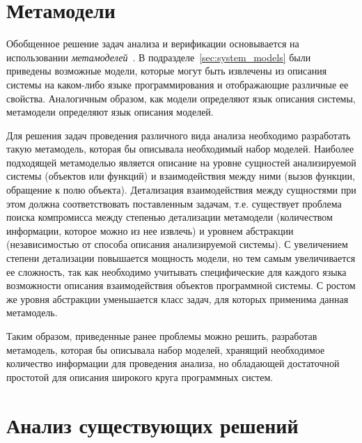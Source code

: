 \section{Метамодели}
\label{sec:metamodels}

Обобщенное решение задач анализа и верификации основывается на использовании
\emph{метамоделей}~\cite{metamodeling}. В подразделе~\ref{sec:system_models}
были приведены возможные модели, которые могут быть извлечены из описания
системы на каком-либо языке программирования и отображающие различные ее
свойства. Аналогичным образом, как модели определяют язык описания системы,
метамодели определяют язык описания моделей.

Для решения задач проведения различного вида анализа необходимо разработать
такую метамодель, которая бы описывала необходимый набор моделей. Наиболее
подходящей метамоделью является описание на уровне сущностей анализируемой
системы (объектов или функций) и взаимодействия между ними (вызов функции,
обращение к полю объекта). Детализация взаимодействия между сущностями при этом
должна соответствовать поставленным задачам, т.е. существует проблема поиска
компромисса между степенью детализации метамодели (количеством информации,
которое можно из нее извлечь) и уровнем абстракции (независимостью от способа
описания анализируемой системы). С увеличением степени детализации повышается
мощность модели, но тем самым увеличивается ее сложность, так как необходимо
учитывать специфические для каждого языка возможности описания взаимодействия
объектов программной системы. С ростом же уровня абстракции уменьшается класс
задач, для которых применима данная метамодель.

Таким образом, приведенные ранее проблемы можно решить, разработав метамодель,
которая бы описывала набор моделей, хранящий необходимое количество информации
для проведения анализа, но обладающей достаточной простотой для описания
широкого круга программных систем.

\section{Анализ существующих решений}
\label{sec:analysis}

